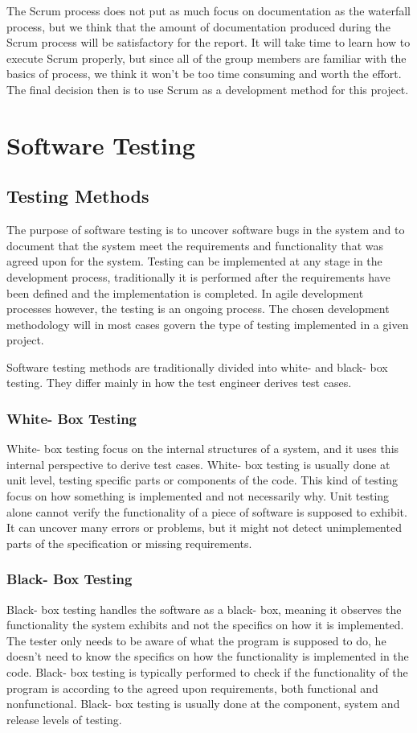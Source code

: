 The Scrum process does not put as much focus on documentation as the waterfall process, but we think that the amount of documentation produced during the Scrum process will be satisfactory for the report. It will take time to learn how to execute Scrum properly, but since all of the group members are familiar with the basics of process, we think it won’t be too time consuming and worth the effort. The final decision then is to use Scrum as a development method for this project.

\section{Software Testing}

\subsection{Testing Methods}
The purpose of software testing is to uncover software bugs in the system and to document that the system meet the requirements and functionality that was agreed upon for the system. Testing can be implemented at any stage in the development process, traditionally it is performed after the requirements have been defined and the implementation is completed. In agile development processes however, the testing is an ongoing process. The chosen development methodology will in most cases govern the type of testing implemented in a given project.

Software testing methods are traditionally divided into white- and black- box testing. They differ mainly in how the test engineer derives test cases.

\subsubsection{White- Box Testing}
White- box testing focus on the internal structures of a system, and it uses this internal perspective to derive test cases. White- box testing is usually done at unit level, testing specific parts or components of the code. This kind of testing focus on how something is implemented and not necessarily why. Unit testing alone cannot verify the functionality of a piece of software is supposed to exhibit. It can uncover many errors or problems, but it might not detect unimplemented parts of the specification or missing requirements.

\subsubsection{Black- Box Testing}
Black- box testing handles the software as a black- box, meaning it observes the functionality the system exhibits and not the specifics on how it is implemented. The tester only needs to be aware of what the program is supposed to do, he doesn't need to know the specifics on how the functionality is implemented in the code. Black- box testing is typically performed to check if the functionality of the program is according to the agreed upon requirements, both functional and nonfunctional. Black- box testing is usually done at the component, system and release levels of testing.

